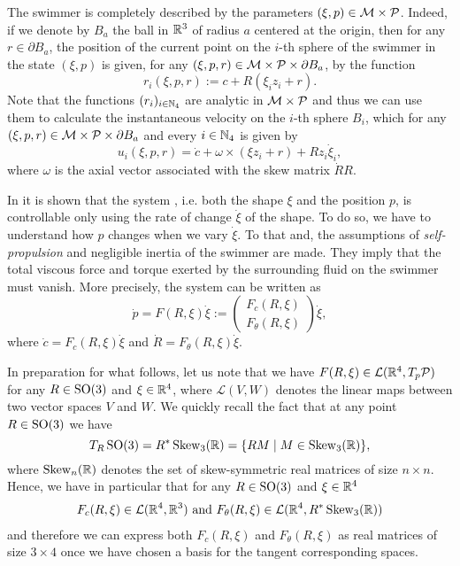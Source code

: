 The swimmer is completely described by the parameters $(\xi, p) \in \mathcal{M} \times \mathcal{P}$. Indeed, if we denote by $B_a$ the ball in $\mathbb{R}^3$ of radius $a$ centered at the origin, then for any $r \in \partial B_a$, the position of the current point on the $i$-th sphere of the swimmer in the state $(\xi, p)$ is given, for any $(\xi, p, r) \in \mathcal{M} \times \mathcal{P} \times \partial B_a$, by the function
\begin{equation}
	r_i(\xi, p, r) :=  c + R(\xi_i z_i + r).
\end{equation}
Note that the functions $(r_i)_{i \in \mathbb{N}_4}$ are analytic in $\mathcal{M}  \times \mathcal{P}$ and thus we can use them to calculate the instantaneous velocity on the $i$-th sphere $B_i$, which for any $(\xi, p, r) \in \mathcal{M} \times \mathcal{P} \times \partial B_a$ and every $i \in \mathbb{N}_4$ is given by
\begin{equation}
	u_i(\xi, p, r) = \dot{c} + \omega \times (\xi z_i + r) + R z_i \dot{\xi}_i,
\end{equation}
where $\omega$ is the axial vector associated with the skew matrix $\dot{R} R$.

In \cite{Alouges2013} it is shown that the system \spr, i.e. both the shape $\xi$ and the position $p$, is controllable only using the rate of change $\dot{\xi}$ of the shape. To do so, we have to understand how $p$ changes when we vary $\dot{\xi}$. To that and, the assumptions of \emph{self-propulsion} and negligible inertia of the swimmer are made. They imply that the total viscous force and torque exerted by the surrounding fluid on the swimmer must vanish. More precisely, the system can be written as
\begin{equation}
\label{eq: control system}
	\dot{p} = F(R, \xi) \dot{\xi} := \left ( \begin{array}{c}
	F_c(R, \xi) \\ 
	\hline
	F_\theta(R, \xi)
	\end{array}  \right ) \dot{\xi},
\end{equation}
where $\dot{c} = F_c(R, \xi) \dot{\xi}$ and $\dot{R} = F_\theta (R, \xi) \dot{\xi} $. 

In preparation for what follows, let us note that we have $F(R, \xi) \in \mathcal{L}(\mathbb{R}^4, T_{p}\mathcal{P})$ for any $R \in \operatorname{SO}(3)$ and $\xi \in \mathbb{R}^4$, where $\mathcal{L}(V, W)$ denotes the linear maps between two vector spaces $V$ and $W$. We quickly recall the fact that at any point $R \in \operatorname{SO}(3)$ we have 
\begin{equation}
	T_R \operatorname{SO}(3) = R^* \operatorname{Skew}_3(\mathbb{R}) = \{R M \mid M \in \operatorname{Skew}_3(\mathbb{R})\},
\end{equation}
where $\operatorname{Skew}_n(\mathbb{R})$ denotes the set of skew-symmetric real matrices of size $n \times n$. Hence, we have in particular that for any $R \in \operatorname{SO}(3)$ and $\xi \in \mathbb{R}^4$
\begin{equation}
\begin{aligned}
	F_c(R, \xi) \in \mathcal{L}(\mathbb{R}^4, \mathbb{R}^3) \text{ and } F_{\theta}(R, \xi) \in \mathcal{L}(\mathbb{R}^4, R^* \operatorname{Skew}_3(\mathbb{R}))
\end{aligned}
\end{equation}
and therefore we can express both $F_c(R, \xi)$ and $F_{\theta}(R, \xi)$ as real matrices of size $3 \times 4$ once we have chosen a basis for the tangent corresponding spaces.


